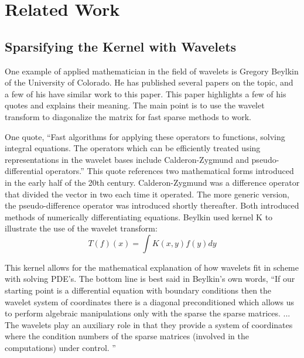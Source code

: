 
\section {Related Work}

\subsection {Sparsifying the Kernel with Wavelets}
One example of applied mathematician in the field of wavelets is Gregory Beylkin of the University of Colorado.  He has published several papers on the topic, and a few of his have similar work to this paper.  %
This paper highlights a few of his quotes and explains their meaning.  The main point is to use the wavelet transform to diagonalize the matrix for fast sparse methods to work.  

One quote, ``Fast algorithms for applying these operators to functions, solving integral equations.  The operators which can be efficiently treated using representations in the wavelet bases include Calderon-Zygmund and pseudo-differential operators.''\cite{bvpbeylkin}  This quote references two mathematical forms introduced in the early half of the 20th century.  Calderon-Zygmund was a difference operator that divided the vector in two each time it operated.  The more generic version, the pseudo-difference operator was introduced shortly thereafter.  Both introduced methods of numerically differentiating equations.  Beylkin used kernel K to illustrate the use of the wavelet transform: 
\[T(f)(x) = \int K(x,y) f(y)dy \]

This kernel allows for the mathematical explanation of how wavelets fit in scheme with %
solving PDE's.  The bottom line is best said in Beylkin's own words, ``If our starting point is a differential equation with boundary conditions then the wavelet system of coordinates there is a diagonal preconditioned which allows us to perform algebraic manipulations only with the sparse the sparse matrices. ... The wavelets play an auxiliary role in that they provide a system of coordinates where the condition numbers of the sparse matrices (involved in the computations) under control.  ''

